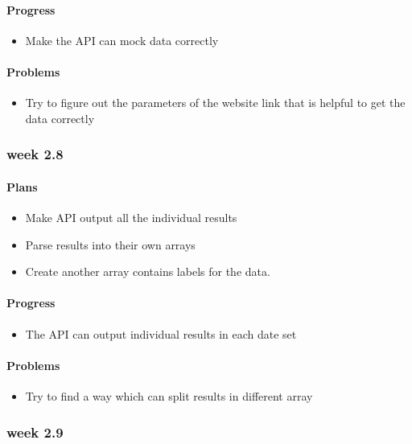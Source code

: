 \documentclass[onecolumn, draftclsnofoot,10pt, compsoc]{article}
\begin{document}
						\paragraph{Progress}
						\begin{itemize}
							\item Make the API can mock data correctly
						\end{itemize}
						\paragraph{Problems}
						\begin{itemize}
							\item Try to figure out the parameters of the website link that is helpful to get the data correctly
						\end{itemize}


				\subsubsection{week 2.8}
					\paragraph{Plans}
						\begin{itemize}
							\item Make API output all the individual results
							\item Parse results into their own arrays
							\item Create another array contains labels for the data.
						\end{itemize}
						\paragraph{Progress}
						\begin{itemize}
							\item The API can output individual results in each date set
						\end{itemize}
						\paragraph{Problems}
						\begin{itemize}
							\item Try to find a way which can split results in different array
						\end{itemize}

				\subsubsection{week 2.9}
\end{document}
